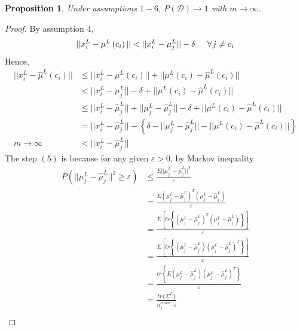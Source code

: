 \documentclass[11pt]{article}
\newtheorem{proposition}{Proposition}
\begin{document}
\begin{proposition}
Under assumptions $1-6$, $P(\mathcal{D}) \to 1$ with $m \to \infty$.
\end{proposition}
\begin{proof}
	By assumption $4$, \[  ||x^L_i-\mu^L \left(c_i\right)|| < ||x^L_i-\mu^L_{j}||-\delta \hspace{0.2in} \forall \hspace{0.01 in}j\neq c_i \] 
	Hence, 
	\begin{align} \nonumber
		||x^L_i-\hat{\mu}^L \left(c_i\right)|| & \leq \nonumber ||x^L_i-\mu^L \left(c_i\right)||+ ||\mu^L \left(c_i\right)-\hat{\mu}^L \left(c_i\right) ||\\ \nonumber
		&< ||x^L_i-\mu^L_{j}||-\delta + ||\mu^L \left(c_i\right)-\hat{\mu}^L \left(c_i\right) ||  \\ \nonumber
		& \leq ||x^L_i-\hat{\mu}^L_{j}||+||\mu^L_{j}-\hat{\mu}^L_{j}||-\delta + ||\mu^L \left(c_i\right)-\hat{\mu}^L \left(c_i\right) ||  \\ \nonumber
		& =  ||x^L_i-\hat{\mu}^L_{j}||-\left\lbrace \delta-||\mu^L_{j}-\hat{\mu}^L_{j}|| -||\mu^L \left(c_i\right)-\hat{\mu}^L \left(c_i\right) || \right\rbrace \\ 
m \to \infty		&<||x^L_i-\hat{\mu}^L_{j}||
	\end{align} 
The step $(5)$ is because for any given $\varepsilon > 0$, by Markov inequality
	\begin{align} \nonumber
	  P\left(||\mu^L_{j}-\hat{\mu}^L_{j}||^2 \geq \varepsilon \right) &\leq \frac{E||\mu^L_{j}-\hat{\mu}^L_{j}||^2}{\varepsilon}  \nonumber \\ \nonumber
	    &=  \frac{E\left(\mu^L_{j}-\hat{\mu}^L_{j}\right)^T\left(\mu^L_{j}-\hat{\mu}^L_{j}\right)}{\varepsilon}  \\ \nonumber
	    &=  \frac{E[ tr\left\lbrace\left(\mu^L_{j}-\hat{\mu}^L_{j}\right)^T\left(\mu^L_{j}-\hat{\mu}^L_{j}\right)\right\rbrace]}{\varepsilon}  \\ \nonumber
	   &=  \frac{E[ tr\left\lbrace\left(\mu^L_{j}-\hat{\mu}^L_{j}\right)\left(\mu^L_{j}-\hat{\mu}^L_{j}\right)^T\right\rbrace]}{\varepsilon}  \\ \nonumber
	  &=  \frac{ tr\left\lbrace E\left(\mu^L_{j}-\hat{\mu}^L_{j}\right)\left(\mu^L_{j}-\hat{\mu}^L_{j}\right)^T\right\rbrace}{\varepsilon}  \\ \nonumber
	  &= \frac{ tr\{\Sigma^L \}}{n^{train}_j \cdot \varepsilon}   \\ \nonumber

\end{align}
\end{proof}
\end{document}
